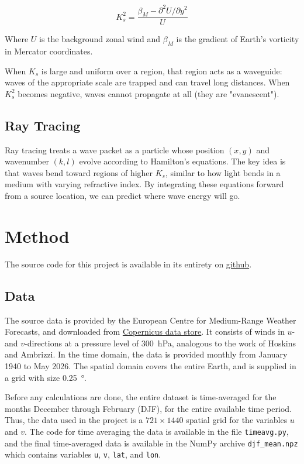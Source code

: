 \documentclass[]{article}
\begin{document}
	\begin{equation}
		K_s^2 = \frac{\beta_M - \partial^2 U / \partial y^2}{U}
	\end{equation}
	
	Where $U$ is the background zonal wind and $\beta_M$ is the gradient of Earth's vorticity in Mercator coordinates. 
	
	When $K_s$ is large and uniform over a region, that region acts as a waveguide: waves of the appropriate scale are trapped and can travel long distances. When $K_s^2$ becomes negative, waves cannot propagate at all (they are "evanescent").
	
	\subsection{Ray Tracing}
	
	Ray tracing treats a wave packet as a particle whose position $(x, y)$ and wavenumber $(k, l)$ evolve according to Hamilton's equations. The key idea is that waves bend toward regions of higher $K_s$, similar to how light bends in a medium with varying refractive index. By integrating these equations forward from a source location, we can predict where wave energy will go.
	
	\section{Method}
	The source code for this project is available in its entirety on \href{https://github.com/johanfritz/AOI}{github}. 
	\subsection{Data}
	The source data is provided by the European Centre for Medium-Range Weather Forecasts, and downloaded from \href{https://cds.climate.copernicus.eu/datasets/reanalysis-era5-single-levels?tab=overview}{Copernicus data store}. It consists of winds in $u$- and $v$-directions at a pressure level of \qty{300}{\hecto\Pa}, analogous to the work of Hoskins and Ambrizzi. In the time domain, the data is provided monthly from January 1940 to May 2026. The spatial domain covers the entire Earth, and is supplied in a grid with size \qty{0.25}{\degree}. 
	
	Before any calculations are done, the entire dataset is time-averaged for the months December through February (DJF), for the entire available time period. Thus, the data used in the project is a $721\times1440$ spatial grid for the variables $u$ and $v$. The code for time averaging the data is available in the file \texttt{timeavg.py}, and the final time-averaged data is available in the NumPy archive \texttt{djf\_mean.npz} which contains variables \texttt{u}, \texttt{v}, \texttt{lat}, and \texttt{lon}.
	
\end{document}
